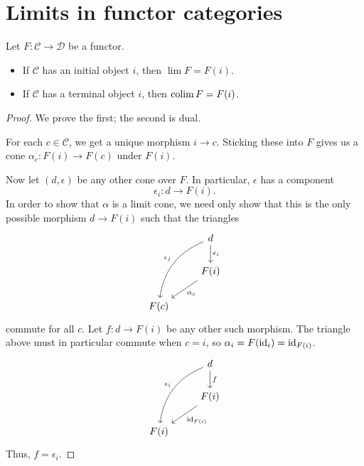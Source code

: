 \documentclass[main.tex]{subfiles}
\begin{document}
\section{Limits in functor categories}
\label{sec:limits_in_functor_categories}

\begin{theorem}
  \label{thm:limit_over_category_with_initial_object_is_that}
  Let $F\colon \mathcal{C} \to \mathcal{D}$ be a functor.

  \begin{itemize}
    \item If $\mathcal{C}$ has an initial object $i$, then $\lim F = F(i)$.

    \item If $\mathcal{C}$ has a terminal object $i$, then $\operatorname*{colim} F = F(i)$.
  \end{itemize}
\end{theorem}
\begin{proof}
  We prove the first; the second is dual.

  For each $c \in \mathcal{C}$, we get a unique morphism $i \to c$. Sticking these into $F$ gives us a cone $\alpha_{c}\colon F(i) \to F(c)$ under $F(i)$.

  Now let $(d, \epsilon)$ be any other cone over $F$. In particular, $\epsilon$ has a component
  \begin{equation*}
    \epsilon_{i}\colon d \to F(i).
  \end{equation*}
  In order to show that $\alpha$ is a limit cone, we need only show that this is the only possible morphism $d \to F(i)$ such that the triangles
  \begin{equation*}
    \begin{tikzcd}
      & d
      \arrow[ddl, bend right, swap, "\epsilon_{j}"]
      \arrow[d, "\epsilon_{i}"]
      \\
      & F(i)
      \arrow[dl, "\alpha_{c}"]
      \\
      F(c)
    \end{tikzcd}
  \end{equation*}
  commute for all $c$. Let $f\colon d \to F(i)$ be any other such morphism. The triangle above must in particular commute when $c = i$, so $\alpha_{i} = F(\mathrm{id}_{i}) = \mathrm{id}_{F(i)}$.
  \begin{equation*}
    \begin{tikzcd}
      & d
      \arrow[ddl, bend right, swap, "\epsilon_{i}"]
      \arrow[d, "f"]
      \\
      & F(i)
      \arrow[dl, "\id_{F(i)}"]
      \\
      F(i)
    \end{tikzcd}
  \end{equation*}
  Thus, $f = \epsilon_{i}$.
\end{proof}
\end{document}
